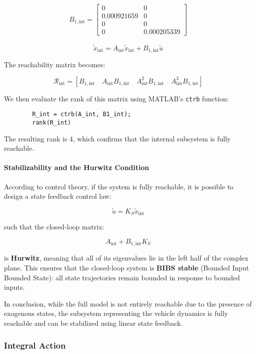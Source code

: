\documentclass[]{report}
\begin{document}
	\[
	B_{1,\text{int}} =
	\begin{bmatrix}
		0 & 0 \\
		0.000921659 & 0  \\
		0 & 0 \\
		0 & 0.000205339 
		
	\end{bmatrix}
	\]
	
	\[
	\dot{\tilde{x}}_{\text{int}} = A_{\text{int}} \tilde{x}_{\text{int}} + B_{1,\text{int}} \tilde{u}
	\]
	
	The reachability matrix becomes:
	
	\[
	\mathcal{R}_{\text{int}} = \left[ B_{1,\text{int}} \quad A_{\text{int}}B_{1,\text{int}} \quad A_{\text{int}}^2B_{1,\text{int}} \quad A_{\text{int}}^3B_{1,\text{int}} \right]
	\]
	
	We then evaluate the rank of this matrix using MATLAB's \texttt{ctrb} function:
	
	\begin{verbatim}
		R_int = ctrb(A_int, B1_int);
		rank(R_int)
	\end{verbatim}
	
	The resulting rank is 4, which confirms that the internal subsystem is fully reachable.
	
	\paragraph{Stabilizability and the Hurwitz Condition}
	
	According to control theory, if the system is fully reachable, it is possible to design a state feedback control law:
	
	\[
	\tilde{u} = K_S \tilde{x}_{\text{int}}
	\]
	
	such that the closed-loop matrix:
	
	\[
	A_{\text{int}} + B_{1,\text{int}} K_S
	\]
	
	is \textbf{Hurwitz}, meaning that all of its eigenvalues lie in the left half of the complex plane. This ensures that the closed-loop system is \textbf{BIBS stable} (Bounded Input Bounded State): all state trajectories remain bounded in response to bounded inputs.
	
	In conclusion, while the full model is not entirely reachable due to the presence of exogenous states, the subsystem representing the vehicle dynamics is fully reachable and can be stabilized using linear state feedback.
	
	
	\subsubsection{Integral Action}
	
\end{document}

